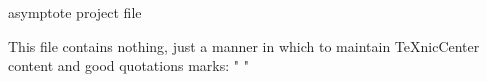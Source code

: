 asymptote project file

This file contains nothing, just a manner in which to maintain TeXnicCenter content and good quotations marks: " "

